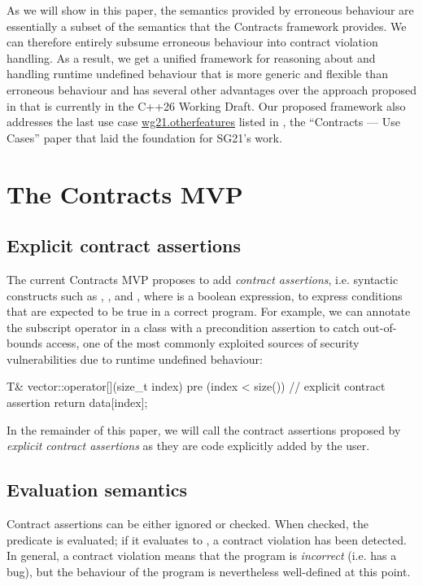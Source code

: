As we will show in this paper, the semantics provided by erroneous behaviour are essentially a subset of the semantics that the Contracts framework provides. We can therefore entirely subsume erroneous behaviour into contract violation handling. As a result, we get a unified framework for reasoning about and handling runtime undefined behaviour that is more generic and flexible than erroneous behaviour and has several other advantages over the approach proposed in \cite{P2795R5} that is currently in the C++26 Working Draft. Our proposed framework  also addresses the last use case \href{https://www.open-std.org/jtc1/sc22/wg21/docs/papers/2020/p1995r1.html\#wg21.otherfeatures}{wg21.otherfeatures} listed in \cite{P1995R1}, the ``Contracts --- Use Cases'' paper that laid the foundation for SG21's work.

\section{The Contracts MVP}
\subsection{Explicit contract assertions}

The current Contracts MVP \cite{P2900R7} proposes to add \emph{contract assertions}, i.e. syntactic constructs such as , , and , where  is a boolean expression, to express conditions that are expected to be true in a correct program. For example, we can annotate the subscript operator in a  class with a precondition assertion to catch out-of-bounds access, one of the most commonly exploited sources of security vulnerabilities due to runtime undefined behaviour:
\begin{codeblock}
T& vector::operator[](size_t index)
pre (index < size()) {  // explicit contract assertion
  return data[index];     
}
\end{codeblock}

In the remainder of this paper, we will call the contract assertions proposed by  \cite{P2900R7} \emph{explicit contract assertions} as they are code explicitly added by the user.

\subsection{Evaluation semantics}

Contract assertions can be either ignored or checked. When checked, the predicate  is evaluated; if it evaluates to , a contract violation has been detected. In general, a contract violation means that the program is \emph{incorrect} (i.e. has a bug), but the behaviour of the program is nevertheless well-defined at this point. 

